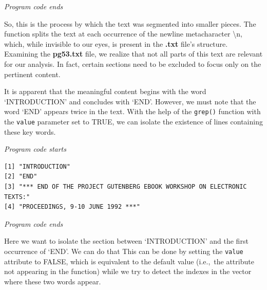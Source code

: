 \emph{Program code ends}

So, this is the process by which the text was segmented into smaller
pieces. The function splits the text at each occurrence of the newline
metacharacter \textbackslash n, which, while invisible to our eyes,
is present in the \textbf{.txt} file's structure. Examining the \textbf{pg53.txt} file, we realize that not all parts
of this text are relevant for our analysis. In fact, certain sections
need to be excluded to focus only on the pertinent content.

It is apparent that the meaningful content begins with the word
`INTRODUCTION' and concludes with `END'. However, we must note that the
word `END' appears twice in the text. With the help of the
\texttt{grep()} function with the \texttt{value} parameter set to TRUE,
we can isolate the existence of lines containing these key words.

\emph{Program code starts}

\begin{Shaded}
\begin{Highlighting}[]
\OtherTok{\textless{}{-}} \NormalTok{(}\SpecialCharTok{\textbackslash{}\textbackslash{}}\SpecialCharTok{\textbackslash{}\textbackslash{}}\SpecialCharTok{\textbackslash{}\textbackslash{}}\SpecialCharTok{\textbackslash{}\textbackslash{}} \NormalTok{)}
\end{Highlighting}
\end{Shaded}

\begin{verbatim}
[1] "INTRODUCTION"                                                        
[2] "END"                                                                 
[3] "*** END OF THE PROJECT GUTENBERG EBOOK WORKSHOP ON ELECTRONIC TEXTS:"
[4] "PROCEEDINGS, 9-10 JUNE 1992 ***"                                     
\end{verbatim}

\emph{Program code ends}

Here we want to isolate the section between `INTRODUCTION' and
the first occurrence of `END'. We can do that This can be done by setting the
\texttt{value} attribute to FALSE, which is equivalent to the default
value (i.e.,~the attribute not appearing in the function) while we try to
detect the indexes in the vector where these two words appear.

